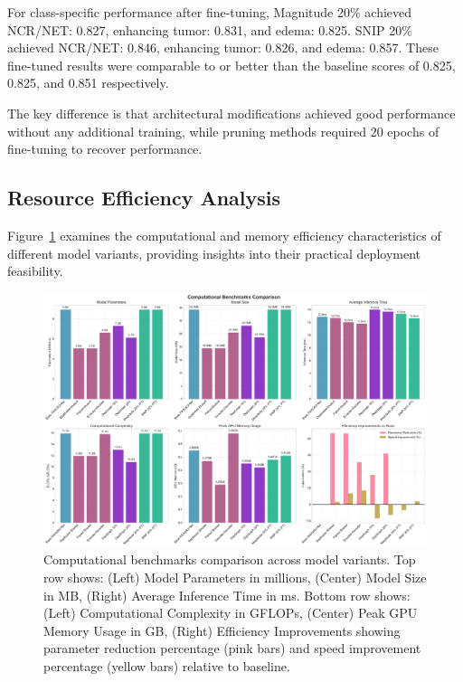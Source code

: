 \documentclass[12pt,a4paper]{article}
\begin{document}
\begin{enumerate}
For class-specific performance after fine-tuning, Magnitude 20\% achieved NCR/NET: 0.827, enhancing tumor: 0.831, and edema: 0.825. SNIP 20\% achieved NCR/NET: 0.846, enhancing tumor: 0.826, and edema: 0.857. These fine-tuned results were comparable to or better than the baseline scores of 0.825, 0.825, and 0.851 respectively.

The key difference is that architectural modifications achieved good performance without any additional training, while pruning methods required 20 epochs of fine-tuning to recover performance.

\subsection{Resource Efficiency Analysis}

Figure~\ref{fig:resource_analysis} examines the computational and memory efficiency characteristics of different model variants, providing insights into their practical deployment feasibility.

\begin{figure}[H]
\centering
\includegraphics[width=\textwidth]{charts/computational_benchmarks_chart.pdf}
\caption{Computational benchmarks comparison across model variants. Top row shows: (Left) Model Parameters in millions, (Center) Model Size in MB, (Right) Average Inference Time in ms. Bottom row shows: (Left) Computational Complexity in GFLOPs, (Center) Peak GPU Memory Usage in GB, (Right) Efficiency Improvements showing parameter reduction percentage (pink bars) and speed improvement percentage (yellow bars) relative to baseline.}
\label{fig:resource_analysis}
\end{figure}


\end{enumerate}
\end{document}
